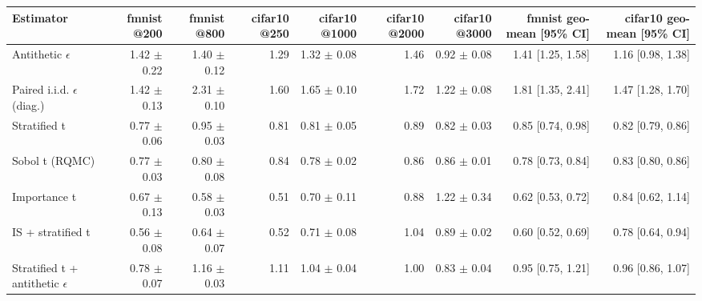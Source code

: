\begin{tabular}{lrrrrrrrr}
\toprule
Estimator & fmnist @200 & fmnist @800 & cifar10 @250 & cifar10 @1000 & cifar10 @2000 & cifar10 @3000 & fmnist geo-mean [95\% CI] & cifar10 geo-mean [95\% CI] \\
\midrule
Antithetic $\epsilon$ & 1.42 $\pm$ 0.22 & 1.40 $\pm$ 0.12 & 1.29 & 1.32 $\pm$ 0.08 & 1.46 & 0.92 $\pm$ 0.08 & 1.41 [1.25, 1.58] & 1.16 [0.98, 1.38] \\
Paired i.i.d. $\epsilon$ (diag.) & 1.42 $\pm$ 0.13 & 2.31 $\pm$ 0.10 & 1.60 & 1.65 $\pm$ 0.10 & 1.72 & 1.22 $\pm$ 0.08 & 1.81 [1.35, 2.41] & 1.47 [1.28, 1.70] \\
Stratified t & 0.77 $\pm$ 0.06 & 0.95 $\pm$ 0.03 & 0.81 & 0.81 $\pm$ 0.05 & 0.89 & 0.82 $\pm$ 0.03 & 0.85 [0.74, 0.98] & 0.82 [0.79, 0.86] \\
Sobol t (RQMC) & 0.77 $\pm$ 0.03 & 0.80 $\pm$ 0.08 & 0.84 & 0.78 $\pm$ 0.02 & 0.86 & 0.86 $\pm$ 0.01 & 0.78 [0.73, 0.84] & 0.83 [0.80, 0.86] \\
Importance t & 0.67 $\pm$ 0.13 & 0.58 $\pm$ 0.03 & 0.51 & 0.70 $\pm$ 0.11 & 0.88 & 1.22 $\pm$ 0.34 & 0.62 [0.53, 0.72] & 0.84 [0.62, 1.14] \\
IS + stratified t & 0.56 $\pm$ 0.08 & 0.64 $\pm$ 0.07 & 0.52 & 0.71 $\pm$ 0.08 & 1.04 & 0.89 $\pm$ 0.02 & 0.60 [0.52, 0.69] & 0.78 [0.64, 0.94] \\
Stratified t + antithetic $\epsilon$ & 0.78 $\pm$ 0.07 & 1.16 $\pm$ 0.03 & 1.11 & 1.04 $\pm$ 0.04 & 1.00 & 0.83 $\pm$ 0.04 & 0.95 [0.75, 1.21] & 0.96 [0.86, 1.07] \\
\bottomrule
\end{tabular}
